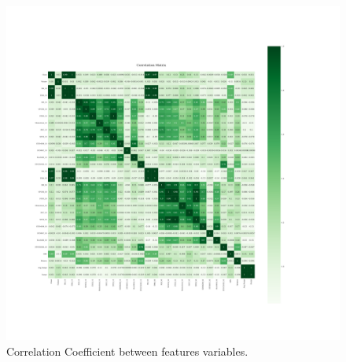 \begin{figure}[H]
\centering
\begin{adjustbox}{max width=1.2\textwidth,center}
    \includegraphics[scale=1.2, trim={30mm 70mm 50mm 110mm}, clip]{./pdf/correlation_matrix.pdf}
\end{adjustbox}
\caption{Correlation Coefficient between features variables.}
\label{fig:corr_coef}
\end{figure}

